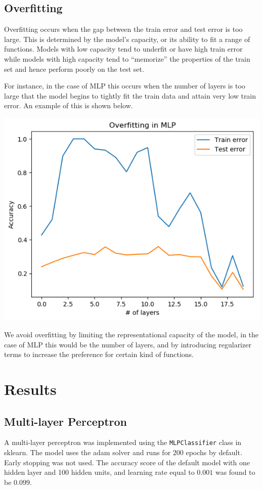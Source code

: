 \documentclass[12pt]{article}
\begin{document}
\subsection*{Overfitting}

Overfitting occurs when the gap between the train error and test error is too large. This is determined by the model's capacity, or its ability to fit a range of functions. Models with low capacity tend to underfit or have high train error while models with high capacity tend to ``memorize'' the properties of the train set and hence perform poorly on the test set.

For instance, in the case of MLP this occurs when the number of layers is too large that the model begins to tightly fit the train data and attain very low train error. An example of this is shown below.

\begin{center}
\includegraphics[scale=0.5]{mlp-overfit.png}
\end{center}

We avoid overfitting by limiting the representational capacity of the model, in the case of MLP this would be the number of layers, and by introducing regularizer terms to increase the preference for certain kind of functions.
\section*{Results}

\subsection*{Multi-layer Perceptron}
A multi-layer perceptron was implemented using the \texttt{MLPClassifier} class in sklearn. The model uses the adam solver and runs for $200$ epochs by default. Early stopping was not used. The accuracy score of the default model with one hidden layer and 100 hidden units, and learning rate equal to $0.001$ was found to be $0.099$.
\end{document}
